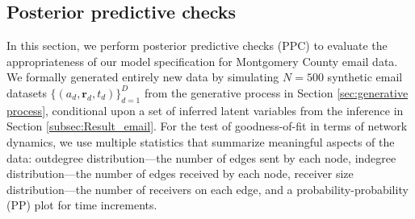 \documentclass[ba]{imsart}
\def\spacingset#1{\renewcommand{\baselinestretch}%
	{#1}\small\normalsize} \spacingset{1}
\numberwithin{equation}{section}
\theoremstyle{plain}
\begin{document}
	\subsection{Posterior predictive checks}\label{subsec:PPC_email} 	   
	In this section, we perform posterior predictive checks (PPC) \citep{rubin1984bayesianly} to evaluate the appropriateness of our model specification for Montgomery County email data. We formally generated entirely new data by simulating $N=500$ synthetic email datasets $\{(a_{d}, \boldsymbol{r}_{d}, t_{d})\}_{d=1}^D$ from the generative process in Section \ref{sec:generative process}, conditional upon a set of inferred latent variables from the inference in Section \ref{subsec:Result_email}. For the test of goodness-of-fit in terms of network dynamics, we use multiple statistics that summarize meaningful aspects of the data: outdegree distribution---the number of edges sent by each node, indegree distribution---the number of edges received by each node, receiver size distribution---the number of receivers on each edge, and a probability-probability (PP) plot for time increments. 

\end{document}
